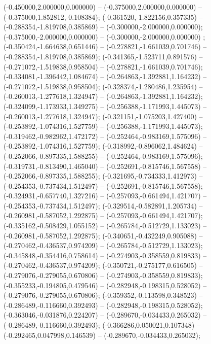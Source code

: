  (-0.450000,2.000000,0.000000) -- (-0.375000,2.000000,0.000000) -- (-0.375000,1.852812,-0.108384);
 (-0.361520,-1.822156,0.357335) -- (-0.288354,-1.819708,0.385869) -- (-0.300000,-2.000000,0.000000);
 (-0.375000,-2.000000,0.000000) -- (-0.300000,-2.000000,0.000000) ;
 (-0.350424,-1.664638,0.651446) -- (-0.278821,-1.661039,0.701746) -- (-0.288354,-1.819708,0.385869);
 (-0.341365,-1.523711,0.891576) -- (-0.271072,-1.519838,0.958504) -- (-0.278821,-1.661039,0.701746);
 (-0.334081,-1.396442,1.084674) -- (-0.264863,-1.392881,1.164232) -- (-0.271072,-1.519838,0.958504);
 (-0.328374,-1.280486,1.235954) -- (-0.260013,-1.277618,1.324947) -- (-0.264863,-1.392881,1.164232);
 (-0.324099,-1.173933,1.349275) -- (-0.256388,-1.171993,1.445073) -- (-0.260013,-1.277618,1.324947);
 (-0.321151,-1.075203,1.427400) -- (-0.253892,-1.074316,1.527759) -- (-0.256388,-1.171993,1.445073);
 (-0.319462,-0.982962,1.472172) -- (-0.252464,-0.983169,1.575096) -- (-0.253892,-1.074316,1.527759);
 (-0.318992,-0.896062,1.484624) -- (-0.252066,-0.897335,1.588255) -- (-0.252464,-0.983169,1.575096);
 (-0.319731,-0.813490,1.465040) -- (-0.252691,-0.815746,1.567558) -- (-0.252066,-0.897335,1.588255);
 (-0.321695,-0.734333,1.412973) -- (-0.254353,-0.737434,1.512497) -- (-0.252691,-0.815746,1.567558);
 (-0.324931,-0.657740,1.327216) -- (-0.257093,-0.661494,1.421707) -- (-0.254353,-0.737434,1.512497);
 (-0.329514,-0.582891,1.205734) -- (-0.260981,-0.587052,1.292875) -- (-0.257093,-0.661494,1.421707);
 (-0.335162,-0.508429,1.055152) -- (-0.265784,-0.512729,1.133023) -- (-0.260981,-0.587052,1.292875);
 (-0.340651,-0.432249,0.905088) -- (-0.270462,-0.436537,0.974209) -- (-0.265784,-0.512729,1.133023);
 (-0.345848,-0.354416,0.758614) -- (-0.274903,-0.358559,0.819833) -- (-0.270462,-0.436537,0.974209);
 (-0.350721,-0.275177,0.616505) -- (-0.279076,-0.279055,0.670806) -- (-0.274903,-0.358559,0.819833);
 (-0.355233,-0.194805,0.479546) -- (-0.282948,-0.198315,0.528052) -- (-0.279076,-0.279055,0.670806);
 (-0.359352,-0.113598,0.348523) -- (-0.286489,-0.116660,0.392493) -- (-0.282948,-0.198315,0.528052);
 (-0.363046,-0.031876,0.224207) -- (-0.289670,-0.034433,0.265032) -- (-0.286489,-0.116660,0.392493);
 (-0.366286,0.050021,0.107348) -- (-0.292465,0.047998,0.146539) -- (-0.289670,-0.034433,0.265032);
